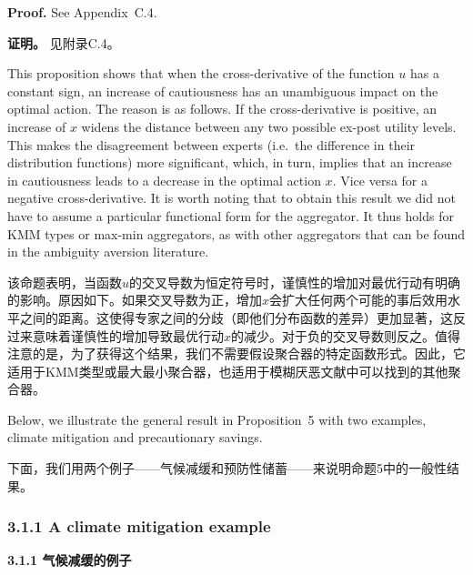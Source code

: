 \documentclass[12pt,a4paper]{article}
\newenvironment{original}
  {\par\noindent\ignorespaces}
  {\par}
\newenvironment{translation}
  {\par\noindent{\color{transblue}\ignorespaces}}
  {\par\medskip}
\begin{document}
\begin{original}
\textbf{Proof.} See Appendix~C.4.
\end{original}

\begin{translation}
\textbf{证明。} 见附录C.4。
\end{translation}

\begin{original}
This proposition shows that when the cross-derivative of the function $u$ has a constant sign, an increase of cautiousness has an unambiguous impact on the optimal action. The reason is as follows. If the cross-derivative is positive, an increase of $x$ widens the distance between any two possible ex-post utility levels. This makes the disagreement between experts (i.e.\ the difference in their distribution functions) more significant, which, in turn, implies that an increase in cautiousness leads to a decrease in the optimal action $x$. Vice versa for a negative cross-derivative. It is worth noting that to obtain this result we did not have to assume a particular functional form for the aggregator. It thus holds for KMM types or max-min aggregators, as with other aggregators that can be found in the ambiguity aversion literature.
\end{original}

\begin{translation}
该命题表明，当函数$u$的交叉导数为恒定符号时，谨慎性的增加对最优行动有明确的影响。原因如下。如果交叉导数为正，增加$x$会扩大任何两个可能的事后效用水平之间的距离。这使得专家之间的分歧（即他们分布函数的差异）更加显著，这反过来意味着谨慎性的增加导致最优行动$x$的减少。对于负的交叉导数则反之。值得注意的是，为了获得这个结果，我们不需要假设聚合器的特定函数形式。因此，它适用于KMM类型或最大最小聚合器，也适用于模糊厌恶文献中可以找到的其他聚合器。
\end{translation}

\begin{original}
Below, we illustrate the general result in Proposition~5 with two examples, climate mitigation and precautionary savings.
\end{original}

\begin{translation}
下面，我们用两个例子——气候减缓和预防性储蓄——来说明命题5中的一般性结果。
\end{translation}

\subsubsection{3.1.1 A climate mitigation example}
{\color{transblue}\textbf{3.1.1 气候减缓的例子}}
\end{document}
